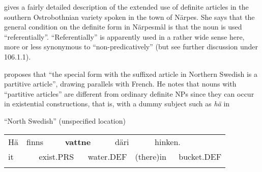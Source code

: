 \begin{styleBodytextC}
\citet{Nikula1997} gives a fairly detailed description of the extended use of definite articles in the southern Ostrobothnian variety spoken in the town of Närpes. She says that the general condition on the definite form in Närpesmål is that the noun is used “referentially”. “Referentially” is apparently used in a rather wide sense here, more or less synonymous to “non-predicatively” (but see further discussion under 106.1.1). 

\end{styleBodytextC}

\begin{styleBodytextC}
\citet[50]{Delsing1993} proposes that “the special form with the suffixed article in Northern Swedish is a partitive article”, drawing parallels with French. He notes that nouns with “partitive articles” are different from ordinary definite NPs since they can occur in existential constructions, that is, with a dummy subject such as \textit{hä} in 

\end{styleBodytextC}

\begin{listWWNumileveli}
\item 

\begin{styleExample}
“North Swedish” (unspecified location)

\end{styleExample}

\end{listWWNumileveli}

\begin{tabular}{llllllllll}
\lsptoprule
Hä & \multicolumn{2}{l}{finns

} & \multicolumn{2}{l}{{\bfseries vattne}

} & \multicolumn{2}{l}{däri

} & \multicolumn{2}{l}{hinken.

} & \\
\multicolumn{2}{l}{it

} & \multicolumn{2}{l}{exist.PRS

} & \multicolumn{2}{l}{water.DEF

} & \multicolumn{2}{l}{(there)in

} & \multicolumn{2}{l}{bucket.DEF

}\\
\lspbottomrule
\end{tabular}

